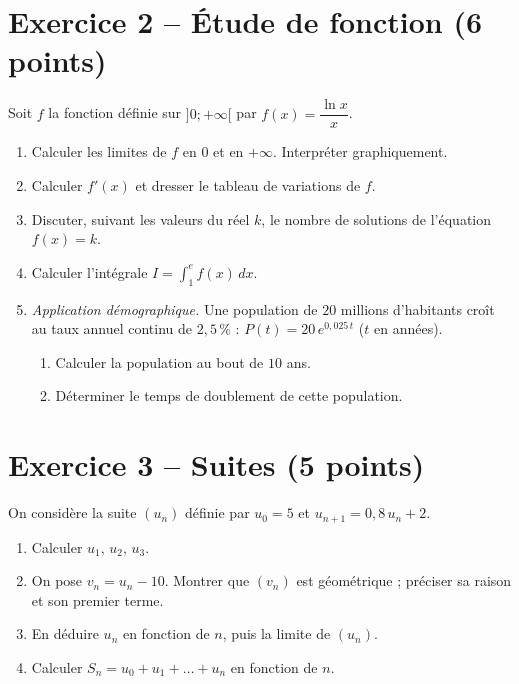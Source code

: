 \documentclass[11pt,a4paper]{article}
\begin{document}
\section*{Exercice 2 -- Étude de fonction (6 points)}
Soit $f$ la fonction définie sur $]0;+\infty[$ par $f(x) = \dfrac{\ln x}{x}$.
\begin{enumerate}
  \item Calculer les limites de $f$ en $0$ et en $+\infty$. Interpréter graphiquement.
  \item Calculer $f'(x)$ et dresser le tableau de variations de $f$.
  \item Discuter, suivant les valeurs du réel $k$, le nombre de solutions de l'équation $f(x) = k$.
  \item Calculer l'intégrale $I = \displaystyle\int_1^{e} f(x)\,dx$.
  \item \emph{Application démographique.} Une population de $20$ millions d'habitants croît au
  taux annuel continu de $2{,}5\,\%$ : $P(t) = 20\,e^{0{,}025\,t}$ ($t$ en années).
  \begin{enumerate}[label=\alph*)]
    \item Calculer la population au bout de $10$ ans.
    \item Déterminer le temps de doublement de cette population.
  \end{enumerate}
\end{enumerate}

\section*{Exercice 3 -- Suites (5 points)}
On considère la suite $(u_n)$ définie par $u_0 = 5$ et $u_{n+1} = 0{,}8\,u_n + 2$.
\begin{enumerate}
  \item Calculer $u_1$, $u_2$, $u_3$.
  \item On pose $v_n = u_n - 10$. Montrer que $(v_n)$ est géométrique ; préciser sa raison et son premier terme.
  \item En déduire $u_n$ en fonction de $n$, puis la limite de $(u_n)$.
  \item Calculer $S_n = u_0 + u_1 + \dots + u_n$ en fonction de $n$.
\end{enumerate}
\end{document}
